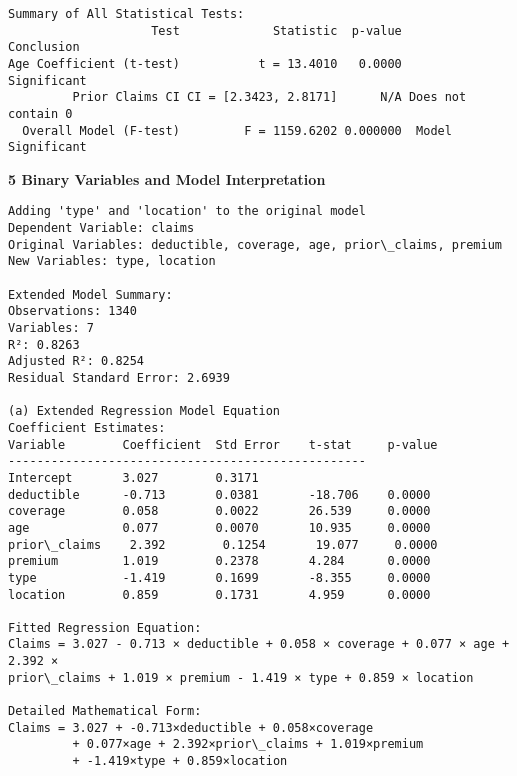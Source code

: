 \documentclass[8pt, twocolumn]{extarticle}
\begin{document}
    \begin{center}
    \end{center}
    { \hspace*{\fill} \\}
    
    \begin{Verbatim}[commandchars=\\\{\}]


Summary of All Statistical Tests:
                    Test             Statistic  p-value         Conclusion
Age Coefficient (t-test)           t = 13.4010   0.0000        Significant
         Prior Claims CI CI = [2.3423, 2.8171]      N/A Does not contain 0
  Overall Model (F-test)         F = 1159.6202 0.000000  Model Significant
    \end{Verbatim}
    \textbf{5 Binary Variables and Model Interpretation}
    \begin{Verbatim}[commandchars=\\\{\}]
Adding 'type' and 'location' to the original model
Dependent Variable: claims
Original Variables: deductible, coverage, age, prior\_claims, premium
New Variables: type, location

Extended Model Summary:
Observations: 1340
Variables: 7
R²: 0.8263
Adjusted R²: 0.8254
Residual Standard Error: 2.6939

(a) Extended Regression Model Equation
Coefficient Estimates:
Variable        Coefficient  Std Error    t-stat     p-value
--------------------------------------------------
Intercept       3.027        0.3171
deductible      -0.713       0.0381       -18.706    0.0000
coverage        0.058        0.0022       26.539     0.0000
age             0.077        0.0070       10.935     0.0000
prior\_claims    2.392        0.1254       19.077     0.0000
premium         1.019        0.2378       4.284      0.0000
type            -1.419       0.1699       -8.355     0.0000
location        0.859        0.1731       4.959      0.0000

Fitted Regression Equation:
Claims = 3.027 - 0.713 × deductible + 0.058 × coverage + 0.077 × age + 2.392 ×
prior\_claims + 1.019 × premium - 1.419 × type + 0.859 × location

Detailed Mathematical Form:
Claims = 3.027 + -0.713×deductible + 0.058×coverage
         + 0.077×age + 2.392×prior\_claims + 1.019×premium
         + -1.419×type + 0.859×location
    \end{Verbatim}
\end{document}
